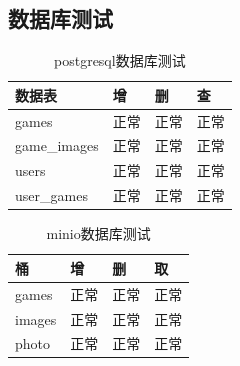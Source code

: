 \documentclass[12pt]{ctexart} %
\begin{document}
\subsection{数据库测试}
\begin{table}[H]
\centering
\Large
\caption{\Large postgresql数据库测试}
\renewcommand{\arraystretch}{1.5} 
\begin{tabular}{|>{\centering\arraybackslash}p{4cm}|>{\centering\arraybackslash}p{2cm}|>{\centering\arraybackslash}p{2cm}|>{\raggedright\arraybackslash}p{2cm}|}
\hline
\textbf{数据表} & \textbf{增} & \textbf{删}& \textbf{查} \\
\hline
games & 正常 & 正常 & 正常 \\
\hline
game\_images & 正常 & 正常 & 正常 \\ 
\hline
users & 正常 & 正常 & 正常 \\ 
\hline
user\_games & 正常 & 正常 & 正常 \\ 
\hline
\end{tabular}
\end{table}

\begin{table}[H]
\centering
\Large
\caption{\Large minio数据库测试}
\renewcommand{\arraystretch}{1.5} 
\begin{tabular}{|>{\centering\arraybackslash}p{4cm}|>{\centering\arraybackslash}p{2cm}|>{\centering\arraybackslash}p{2cm}|>{\raggedright\arraybackslash}p{2cm}|}
\hline
\textbf{桶} & \textbf{增} & \textbf{删}& \textbf{取} \\
\hline
games & 正常 & 正常 & 正常 \\
\hline
images & 正常 & 正常 & 正常 \\ 
\hline
photo & 正常 & 正常 & 正常 \\ 
\hline
\end{tabular}
\end{table}
\end{document}
